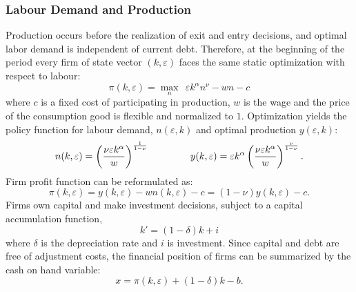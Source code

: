 \documentclass[12pt]{article}
\begin{document}
\subsubsection{Labour Demand and Production \label{sec:labour demand}}
Production occurs before the realization of exit and entry decisions, and optimal labor demand is independent of current debt. Therefore, at the beginning of the period every firm of state vector $(k,\varepsilon)$ faces the same static optimization with respect to labour: 
$$ \pi(k,\varepsilon) = \max_{n} \ \  \varepsilon k^{\alpha}n^{\nu} - wn - c$$
where $c$ is a fixed cost of participating in production, $w$ is the wage and the price of the consumption good is flexible and normalized to $1$. Optimization yields the policy function for labour demand, $n(\varepsilon,k)$ and optimal production $y(\varepsilon,k)$: 
\begin{equation} \label{eq:opt_emp_prod}
n(k,\varepsilon) = \left( \dfrac{ \nu \varepsilon k^\alpha}{w} \right)^{\frac{1}{1-\nu}} \hspace{15mm}
y(k,\varepsilon) = \varepsilon k^{\alpha} \left( \dfrac{\nu \varepsilon k^\alpha}{w} \right)^{\frac{\nu}{1-\nu}}.
\end{equation}  
Firm profit function can be reformulated as: 
\begin{equation} \label{eq:profit}
\pi(k,\varepsilon) = y(k,\varepsilon) - wn(k,\varepsilon) - c = (1-\nu) y(k,\varepsilon) - c.
\end{equation} 
Firms own capital and make investment decisions, subject to a capital accumulation function,
\begin{equation} \label{eq:capital}
k' = (1-\delta)k + i
\end{equation} 
where $\delta$ is the depreciation rate and $i$ is investment. Since capital and debt are free of adjustment costs, the financial position of firms can be summarized by the cash on hand variable:
\begin{equation} \label{eq:cash on hand}
    x = \pi(k,\varepsilon) + (1-\delta)k - b.
\end{equation}
\end{document}

